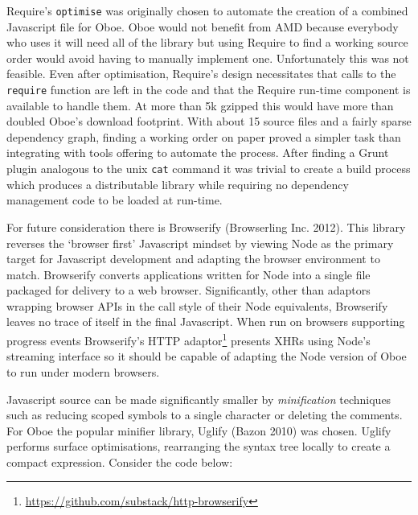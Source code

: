 \documentclass[12pt, ]{article}
\begin{document}
Require's \texttt{optimise} was originally chosen to automate the
creation of a combined Javascript file for Oboe. Oboe would not benefit
from AMD because everybody who uses it will need all of the library but
using Require to find a working source order would avoid having to
manually implement one. Unfortunately this was not feasible. Even after
optimisation, Require's design necessitates that calls to the
\texttt{require} function are left in the code and that the Require
run-time component is available to handle them. At more than 5k gzipped
this would have more than doubled Oboe's download footprint. With about
15 source files and a fairly sparse dependency graph, finding a working
order on paper proved a simpler task than integrating with tools
offering to automate the process. After finding a Grunt plugin analogous
to the unix \texttt{cat} command it was trivial to create a build
process which produces a distributable library while requiring no
dependency management code to be loaded at run-time.

For future consideration there is Browserify (Browserling Inc. 2012).
This library reverses the `browser first' Javascript mindset by viewing
Node as the primary target for Javascript development and adapting the
browser environment to match. Browserify converts applications written
for Node into a single file packaged for delivery to a web browser.
Significantly, other than adaptors wrapping browser APIs in the call
style of their Node equivalents, Browserify leaves no trace of itself in
the final Javascript. When run on browsers supporting progress events
Browserify's HTTP adaptor\footnote{\url{https://github.com/substack/http-browserify}}
presents XHRs using Node's streaming interface so it should be capable
of adapting the Node version of Oboe to run under modern browsers.

Javascript source can be made significantly smaller by
\emph{minification} techniques such as reducing scoped symbols to a
single character or deleting the comments. For Oboe the popular minifier
library, Uglify (Bazon 2010) was chosen. Uglify performs surface
optimisations, rearranging the syntax tree locally to create a compact
expression. Consider the code below:
\end{document}
